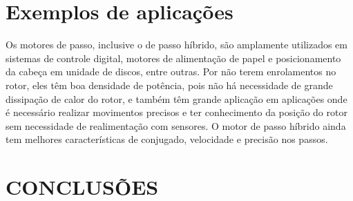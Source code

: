 \documentclass[portugues]{sobraep}
\begin{document}
\section{Exemplos de aplicações}
Os motores de passo, inclusive o de passo híbrido, são amplamente utilizados em sistemas de controle digital, motores de alimentação de papel e posicionamento da cabeça em unidade de discos, entre outras. Por não terem enrolamentos no rotor, eles têm boa densidade de potência, pois não há necessidade de grande dissipação de calor do rotor, e também têm grande aplicação em aplicações onde é necessário realizar movimentos precisos e ter conhecimento da posição do rotor sem necessidade de realimentação com sensores. O motor de passo híbrido ainda tem melhores características de conjugado, velocidade e precisão nos passos. \cite{Fitz}

\section{CONCLUSÕES}





\end{document}
